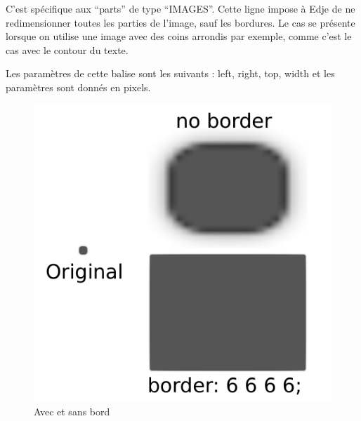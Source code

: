\documentclass[a4paper]{efr}
\begin{document}
C'est spécifique aux ``parts'' de type ``IMAGES''. Cette ligne impose à Edje de ne
redimensionner toutes les parties de l'image, sauf les bordures. Le cas se
présente lorsque on utilise une image avec des coins arrondis par
exemple, comme c'est le cas avec le contour du texte.

Les paramètres de cette balise sont les suivants : left, right, top, width et les
paramètres sont donnés en pixels.

\begin{figure}
  \begin{center}
    \includegraphics[scale=0.5]{images/border_diff.pdf}
  \end{center}
  \caption{Avec et sans bord}
\end{figure}
\end{document}
